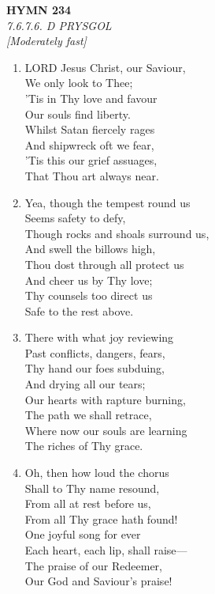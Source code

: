 \newpage
\begin{center}
    {\Large \textbf{HYMN 234}}
    \\
    \textit{7.6.7.6. D PRYSGOL}
    \\
    \textit{\small [Moderately fast]}
\end{center}
\vspace{1em}

\begin{enumerate}
    \item LORD Jesus Christ, our Saviour, \\
            We only look to Thee; \\
        'Tis in Thy love and favour \\
            Our souls find liberty. \\
        Whilst Satan fiercely rages \\
            And shipwreck oft we fear, \\
        'Tis this our grief assuages, \\
            That Thou art always near.

    \item Yea, though the tempest round us \\
            Seems safety to defy, \\
        Though rocks and shoals surround us, \\
            And swell the billows high, \\
        Thou dost through all protect us \\
            And cheer us by Thy love; \\
        Thy counsels too direct us \\
            Safe to the rest above.

    \item There with what joy reviewing \\
            Past conflicts, dangers, fears, \\
        Thy hand our foes subduing, \\
            And drying all our tears; \\
        Our hearts with rapture burning, \\
            The path we shall retrace, \\
        Where now our souls are learning \\
            The riches of Thy grace.

    \item Oh, then how loud the chorus \\
            Shall to Thy name resound, \\
        From all at rest before us, \\
            From all Thy grace hath found! \\
        One joyful song for ever \\
            Each heart, each lip, shall raise--- \\
        The praise of our Redeemer, \\
            Our God and Saviour's praise!

\end{enumerate}

